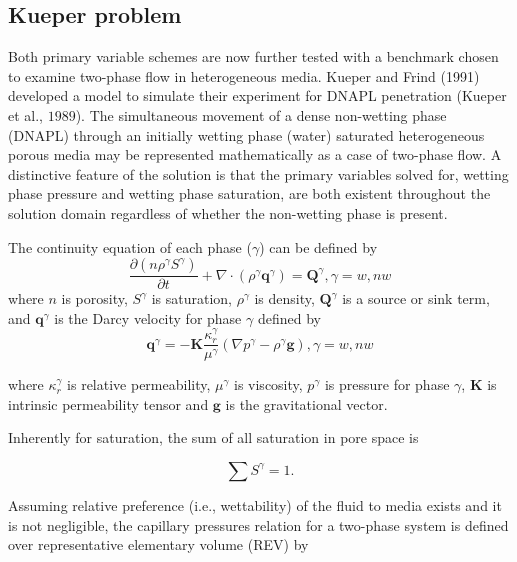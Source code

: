 \subsection{Kueper problem}
Both primary variable schemes are now further tested with a benchmark chosen to examine two-phase flow in heterogeneous media. Kueper and Frind (1991) developed a model to simulate their experiment for DNAPL penetration (Kueper et al., $1989$). The simultaneous movement of a dense non-wetting phase (DNAPL) through an initially wetting phase (water) saturated heterogeneous porous media may be represented mathematically as a case of two-phase flow. A distinctive feature of the solution is that the primary variables solved for, wetting phase pressure and wetting phase saturation, are both existent throughout the solution domain regardless of whether the non-wetting phase is present.

The continuity equation of each phase ($\gamma$) can be defined by
\begin{equation}
\frac{\partial (n {\rho}^{\gamma} S^{\gamma})}{\partial t} + \nabla \cdot ({\rho}^{\gamma} \mathbf{q}^{\gamma}) = \mathbf{Q}^{\gamma}, \gamma=w, nw
\label{eq:mcwtMassEq}
\end{equation}
where $n$ is porosity, $S^{\gamma}$ is saturation, $\rho^{\gamma}$ is density, $\mathbf{Q}^{\gamma}$ is a source or sink term, and $\mathbf{q}^{\gamma}$ is the Darcy velocity for phase $\gamma$ defined by
\begin{equation}
\mathbf{q}^{\gamma}=-{\mathbf K} \frac{\kappa_r^{\gamma}}{\mu^{\gamma}}(\nabla p^{\gamma}-{\rho}^{\gamma} \mathbf{g}), \gamma=w, nw
\label{eq:mcwtFluxEq}
\end{equation}

where $\kappa_r^{\gamma}$ is relative permeability, $\mu^{\gamma}$ is viscosity, $p^{\gamma}$ is pressure for phase $\gamma$, $\textbf{K}$ is intrinsic permeability tensor and $\mathbf{g}$ is the gravitational vector.  

Inherently for saturation, the sum of all saturation in pore space is

\begin{equation}
{\sum S^{\gamma}}=1.
\label{eq:mcwtFluxEq}
\end{equation}

Assuming relative preference (i.e., wettability) of the fluid to media exists and it is not negligible, the capillary pressures relation for a two-phase system is defined over representative elementary volume (REV) by 

